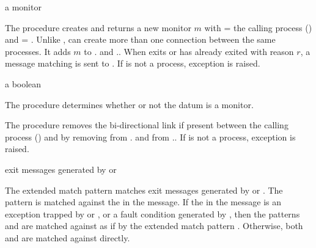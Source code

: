\begin{procedure}
\end{procedure}
\returns{} a monitor

The  procedure creates and returns a new monitor $m$
with  = the calling process () and
 = .  Unlike ,
 can create more than one connection between the same
processes.  It adds $m$ to . and
..  When  exits or has
already exited with reason $r$, a message matching
 is sent to .
If  is not
a process, exception  is
raised.

\begin{procedure}
\end{procedure}
\returns{} a boolean

The  procedure determines whether or not the datum
 is a monitor.

\begin{procedure}
\end{procedure}
\returns{} 

The  procedure removes the bi-directional link if
present between the calling process () and  by
removing  from . and
 from ..  If  is not
a process, exception  is
raised.

\begin{match-extension}
\end{match-extension}
\matches{} exit messages generated by  or 

The extended match pattern 
matches exit messages generated by  or .
The pattern  is matched against the  in the message.
If the  in the message is
an exception trapped by  or , or
a fault condition generated by ,
then the patterns  and  are matched against
 as if by the extended match pattern
.
Otherwise, both  and  are matched against  directly.

